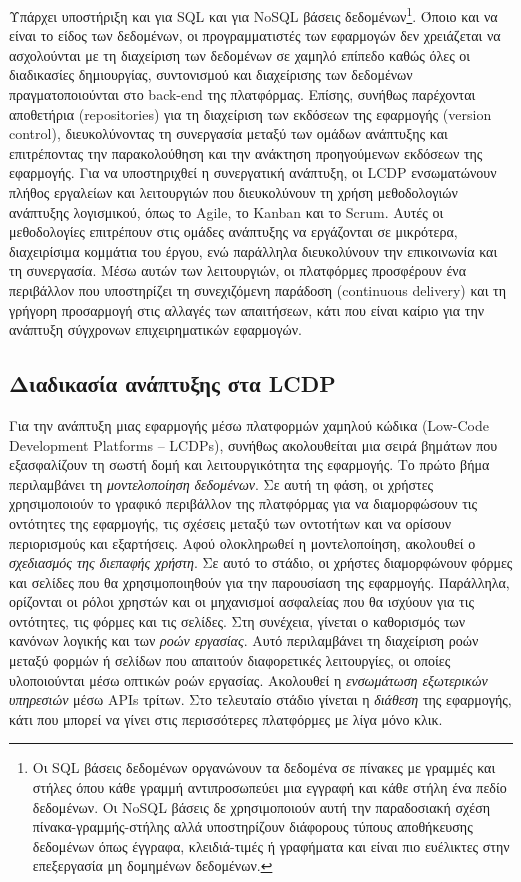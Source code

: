             Υπάρχει υποστήριξη και για SQL και για NoSQL βάσεις δεδομένων\footnote{Οι SQL βάσεις δεδομένων οργανώνουν τα δεδομένα σε πίνακες με γραμμές και στήλες όπου κάθε γραμμή αντιπροσωπεύει μια εγγραφή και κάθε στήλη ένα πεδίο δεδομένων. Οι NoSQL βάσεις δε χρησιμοποιούν αυτή την παραδοσιακή σχέση πίνακα-γραμμής-στήλης αλλά υποστηρίζουν διάφορους τύπους αποθήκευσης δεδομένων όπως έγγραφα, κλειδιά-τιμές ή γραφήματα και είναι πιο ευέλικτες στην επεξεργασία μη δομημένων δεδομένων.}. Όποιο και να είναι το είδος των δεδομένων, οι προγραμματιστές των εφαρμογών δεν χρειάζεται να ασχολούνται με τη διαχείριση των δεδομένων σε χαμηλό επίπεδο καθώς όλες οι διαδικασίες δημιουργίας, συντονισμού και διαχείρισης των δεδομένων πραγματοποιούνται στο back-end της πλατφόρμας. Επίσης, συνήθως παρέχονται αποθετήρια (repositories) για τη διαχείριση των εκδόσεων της εφαρμογής (version control), διευκολύνοντας τη συνεργασία μεταξύ των ομάδων ανάπτυξης και επιτρέποντας την παρακολούθηση και την ανάκτηση προηγούμενων εκδόσεων της εφαρμογής. Για να υποστηριχθεί η συνεργατική ανάπτυξη, οι LCDP ενσωματώνουν πλήθος εργαλείων και λειτουργιών που διευκολύνουν τη χρήση μεθοδολογιών ανάπτυξης λογισμικού, όπως το Agile, το Kanban και το Scrum. Αυτές οι μεθοδολογίες επιτρέπουν στις ομάδες ανάπτυξης να εργάζονται σε μικρότερα, διαχειρίσιμα κομμάτια του έργου, ενώ παράλληλα διευκολύνουν την επικοινωνία και τη συνεργασία. Μέσω αυτών των λειτουργιών, οι πλατφόρμες προσφέρουν ένα περιβάλλον που υποστηρίζει τη συνεχιζόμενη παράδοση (continuous delivery) και τη γρήγορη προσαρμογή στις αλλαγές των απαιτήσεων, κάτι που είναι καίριο για την ανάπτυξη σύγχρονων επιχειρηματικών εφαρμογών.

        \subsection{Διαδικασία ανάπτυξης στα LCDP}
            Για την ανάπτυξη μιας εφαρμογής μέσω πλατφορμών χαμηλού κώδικα (Low-Code Development Platforms – LCDPs), συνήθως ακολουθείται μια σειρά βημάτων που εξασφαλίζουν τη σωστή δομή και λειτουργικότητα της εφαρμογής. Το πρώτο βήμα περιλαμβάνει τη \textit{μοντελοποίηση δεδομένων}. Σε αυτή τη φάση, οι χρήστες χρησιμοποιούν το γραφικό περιβάλλον της πλατφόρμας για να διαμορφώσουν τις οντότητες της εφαρμογής, τις σχέσεις μεταξύ των οντοτήτων και να ορίσουν περιορισμούς και εξαρτήσεις. Αφού ολοκληρωθεί η μοντελοποίηση, ακολουθεί ο \textit{σχεδιασμός της διεπαφής χρήστη}. Σε αυτό το στάδιο, οι χρήστες διαμορφώνουν φόρμες και σελίδες που θα χρησιμοποιηθούν για την παρουσίαση της εφαρμογής. Παράλληλα, ορίζονται οι ρόλοι χρηστών και οι μηχανισμοί ασφαλείας που θα ισχύουν για τις οντότητες, τις φόρμες και τις σελίδες. Στη συνέχεια, γίνεται ο καθορισμός των κανόνων λογικής και των \textit{ροών εργασίας}. Αυτό περιλαμβάνει τη διαχείριση ροών μεταξύ φορμών ή σελίδων που απαιτούν διαφορετικές λειτουργίες, οι οποίες υλοποιούνται μέσω οπτικών ροών εργασίας. Ακολουθεί η \textit{ενσωμάτωση εξωτερικών υπηρεσιών} μέσω APIs τρίτων. Στο τελευταίο στάδιο γίνεται η \textit{διάθεση} της εφαρμογής, κάτι που μπορεί να γίνει στις περισσότερες πλατφόρμες με λίγα μόνο κλικ.

